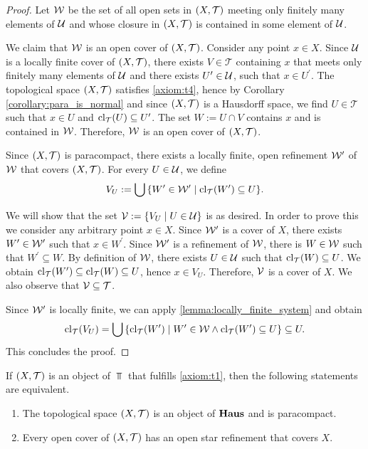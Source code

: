 \begin{proof}
	Let $\cover[W]$ be the set of all open sets in $\tspace$ meeting only finitely many elements of $\cover$ and whose closure in $\tspace$ is contained in some element of $\cover$.
	
	We claim that $\cover[W]$ is an open cover of $\tspace$. Consider any point $x \in X$. Since $\cover$ is a locally finite cover of $\tspace$, there exists $V \in \mathcal{T}$ containing $x$ that meets only finitely many elements of $\cover$ and there exists $U^\prime \in \cover$, such that $x \in U^\prime$. The topological space $\tspace$ satisfies \ref{axiom:t4}, hence by Corollary \ref{corollary:para_is_normal} and since $\tspace$ is a Hausdorff space, we find $U \in \mathcal{T}$ such that $x \in U$ and $\cl{U} \subseteq U^\prime$. The set $W := U \cap V$ contains $x$ and is contained in $\cover[W]$. Therefore, $\cover[W]$ is an open cover of $\tspace$. 
	
	Since $\tspace$ is paracompact, there exists a locally finite, open refinement $\cover[W]^\prime$ of $\cover[W]$ that covers $\tspace$. For every $U \in \cover$, we define
	\begin{align*}
	V_U := \bigcup \Bbraces{W^\prime \in \cover[W]^\prime \mid \cl{W^\prime} \subseteq U}.
	\end{align*}
	
	We will show that the set $\cover[V] := \Bbraces{V_U \mid U \in \cover}$ is as desired. In order to prove this we consider any arbitrary point $x \in X$. Since $\cover[W]^\prime$ is a cover of $X$, there exists $W^\prime \in \cover[W]^\prime$ such that $x \in W^\prime$. Since $\cover[W]^\prime$ is a refinement of $\cover[W]$, there is $W \in \cover[W]$ such that $W^\prime \subseteq W$. By definition of $\cover[W]$, there exists $U \in \cover$ such that $\cl{W} \subseteq U$. We obtain $\cl{W^\prime} \subseteq \cl{W} \subseteq U$, hence $x \in V_U$. Therefore, $\cover[V]$ is a cover of $X$. We also observe that $\cover[V] \subseteq \mathcal{T}$. 
	
	Since $\cover[W]^\prime$ is locally finite, we can apply \ref{lemma:locally_finite_system} and obtain
	\begin{align*}
	\cl{V_U} = \bigcup \Bbraces{\cl{W^\prime} \mid W^\prime \in \cover[W] \land \cl{W^\prime} \subseteq U} \subseteq U.
	\end{align*}
	This concludes the proof.
\end{proof}

\begin{theorem} \label{theorem:stone_coi} \cite[p. 77]{Top}
	If $\tspace$ is an object of $\Top$ that fulfills \ref{axiom:t1}, then the following statements are equivalent.
	\begin{enumerate}
		\item The topological space $\tspace$ is an object of $\Haus$ and is paracompact.
		
		\item Every open cover of $\tspace$ has an open star refinement that covers $X$. 
	\end{enumerate}
\end{theorem}

